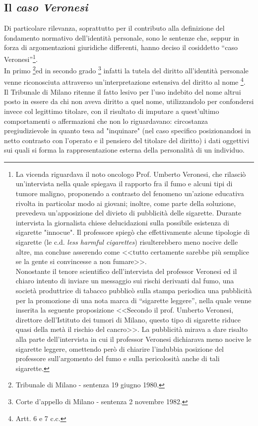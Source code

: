 \subsection{Il \textit{caso Veronesi}}
Di particolare rilevanza, soprattutto per il contributo alla definizione del fondamento normativo dell’identità personale, sono le sentenze che, seppur in forza di argomentazioni giuridiche differenti, hanno deciso il cosiddetto “caso Veronesi”\footnote{La vicenda riguardava il noto oncologo Prof. Umberto Veronesi, che  rilasciò un’intervista nella quale spiegava il rapporto fra il fumo e alcuni tipi di tumore maligno, proponendo a contrasto del fenomeno un'azione educativa rivolta in particolar modo ai giovani; inoltre, come parte della soluzione, prevedeva un'apposizione del divieto di pubblicità delle sigarette. Durante intervista la giornalista chiese delucidazioni sulla possibile esistenza di sigarette "innocue". Il professore spiegò che effettivamente alcune tipologie di sigarette (le c.d.\textit{ less harmful cigarettes}) risulterebbero meno nocive delle altre, ma concluse asserendo come <<tutto certamente sarebbe più semplice se la gente si convincesse a non fumare>>.\\Nonostante il tenore scientifico dell’intervista del professor Veronesi ed il chiaro intento di inviare un messaggio sui rischi derivanti dal fumo, una società produttrice di tabacco pubblicò sulla stampa periodica una pubblicità per la promozione di una nota marca di “sigarette leggere”, nella quale venne inserita la seguente proposizione <<Secondo il prof. Umberto Veronesi, direttore dell’Istituto dei tumori di Milano, questo tipo di sigarette riduce quasi della metà il rischio del cancro>>. La pubblicità mirava a dare risalto alla parte dell’intervista in cui il professor Veronesi dichiarava meno nocive le sigarette leggere, omettendo però di chiarire l'indubbia posizione del professore sull'argomento del fumo e sulla pericolosità anche di tali sigarette.}.
\\In primo \footnote{Tribunale di Milano - sentenza 19 giugno 1980.}ed in secondo grado \footnote{Corte d’appello di Milano - sentenza 2 novembre 1982.} infatti la tutela del diritto all’identità personale venne riconosciuta attraverso un’interpretazione estensiva del diritto al nome \footnote{Artt. 6 e 7 c.c.}.
\\Il Tribunale di Milano ritenne il fatto lesivo per l’uso indebito del nome altrui posto in essere da chi non aveva diritto a quel nome, utilizzandolo per confondersi invece col legittimo titolare, con il risultato di imputare a quest’ultimo comportamenti o affermazioni che non lo riguardavano: circostanza pregiudizievole in quanto tesa ad "inquinare" (nel caso specifico posizionandosi in netto contrasto con l'operato e il pensiero del titolare del diritto) i dati oggettivi sui quali si forma la rappresentazione esterna della personalità di un individuo. 
